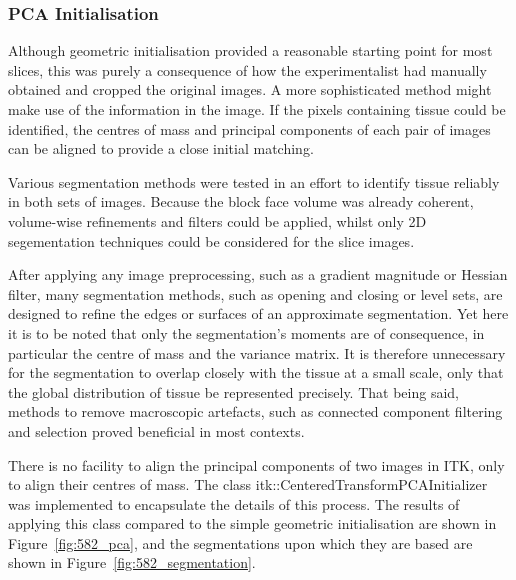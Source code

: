 		\subsubsection{PCA Initialisation} %
		\label{ssub:pca_initialisation}
			Although geometric initialisation provided a reasonable starting point for most slices, this was purely a consequence of how the experimentalist had manually obtained and cropped the original images. A more sophisticated method might make use of the information in the image. If the pixels containing tissue could be identified, the centres of mass and principal components of each pair of images can be aligned to provide a close initial matching.
		
		  Various segmentation methods were tested in an effort to identify tissue reliably in both sets of images. Because the block face volume was already coherent, volume-wise refinements and filters could be applied, whilst only 2D segementation techniques could be considered for the slice images.
			
			After applying any image preprocessing, such as a gradient magnitude or Hessian filter, many segmentation methods, such as opening and closing or level sets, are designed to refine the edges or surfaces of an approximate segmentation. Yet here it is to be noted that only the segmentation's moments are of consequence, in particular the centre of mass and the variance matrix. It is therefore unnecessary for the segmentation to overlap closely with the tissue at a small scale, only that the global distribution of tissue be represented precisely. That being said, methods to remove macroscopic artefacts, such as connected component filtering and selection proved beneficial in most contexts.
			
		  There is no facility to align the principal components of two images in ITK, only to align their centres of mass. The class itk::CenteredTransformPCAInitializer was implemented to encapsulate the details of this process. The results of applying this class compared to the simple geometric initialisation are shown in Figure~\ref{fig:582_pca}, and the segmentations upon which they are based are shown in Figure~\ref{fig:582_segmentation}.
		
